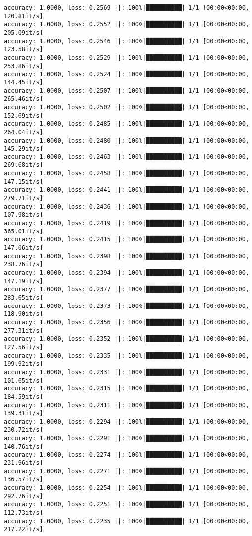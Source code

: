 \documentclass[
]{article}
\begin{document}
\begin{verbatim}
accuracy: 1.0000, loss: 0.2569 ||: 100%|██████████| 1/1 [00:00<00:00, 120.81it/s]
accuracy: 1.0000, loss: 0.2552 ||: 100%|██████████| 1/1 [00:00<00:00, 205.09it/s]
accuracy: 1.0000, loss: 0.2546 ||: 100%|██████████| 1/1 [00:00<00:00, 123.58it/s]
accuracy: 1.0000, loss: 0.2529 ||: 100%|██████████| 1/1 [00:00<00:00, 253.86it/s]
accuracy: 1.0000, loss: 0.2524 ||: 100%|██████████| 1/1 [00:00<00:00, 144.45it/s]
accuracy: 1.0000, loss: 0.2507 ||: 100%|██████████| 1/1 [00:00<00:00, 265.46it/s]
accuracy: 1.0000, loss: 0.2502 ||: 100%|██████████| 1/1 [00:00<00:00, 152.69it/s]
accuracy: 1.0000, loss: 0.2485 ||: 100%|██████████| 1/1 [00:00<00:00, 264.04it/s]
accuracy: 1.0000, loss: 0.2480 ||: 100%|██████████| 1/1 [00:00<00:00, 145.29it/s]
accuracy: 1.0000, loss: 0.2463 ||: 100%|██████████| 1/1 [00:00<00:00, 269.68it/s]
accuracy: 1.0000, loss: 0.2458 ||: 100%|██████████| 1/1 [00:00<00:00, 147.15it/s]
accuracy: 1.0000, loss: 0.2441 ||: 100%|██████████| 1/1 [00:00<00:00, 279.71it/s]
accuracy: 1.0000, loss: 0.2436 ||: 100%|██████████| 1/1 [00:00<00:00, 107.98it/s]
accuracy: 1.0000, loss: 0.2419 ||: 100%|██████████| 1/1 [00:00<00:00, 365.01it/s]
accuracy: 1.0000, loss: 0.2415 ||: 100%|██████████| 1/1 [00:00<00:00, 147.06it/s]
accuracy: 1.0000, loss: 0.2398 ||: 100%|██████████| 1/1 [00:00<00:00, 238.76it/s]
accuracy: 1.0000, loss: 0.2394 ||: 100%|██████████| 1/1 [00:00<00:00, 147.19it/s]
accuracy: 1.0000, loss: 0.2377 ||: 100%|██████████| 1/1 [00:00<00:00, 283.65it/s]
accuracy: 1.0000, loss: 0.2373 ||: 100%|██████████| 1/1 [00:00<00:00, 118.90it/s]
accuracy: 1.0000, loss: 0.2356 ||: 100%|██████████| 1/1 [00:00<00:00, 277.31it/s]
accuracy: 1.0000, loss: 0.2352 ||: 100%|██████████| 1/1 [00:00<00:00, 127.56it/s]
accuracy: 1.0000, loss: 0.2335 ||: 100%|██████████| 1/1 [00:00<00:00, 199.92it/s]
accuracy: 1.0000, loss: 0.2331 ||: 100%|██████████| 1/1 [00:00<00:00, 101.65it/s]
accuracy: 1.0000, loss: 0.2315 ||: 100%|██████████| 1/1 [00:00<00:00, 184.59it/s]
accuracy: 1.0000, loss: 0.2311 ||: 100%|██████████| 1/1 [00:00<00:00, 139.31it/s]
accuracy: 1.0000, loss: 0.2294 ||: 100%|██████████| 1/1 [00:00<00:00, 230.72it/s]
accuracy: 1.0000, loss: 0.2291 ||: 100%|██████████| 1/1 [00:00<00:00, 140.76it/s]
accuracy: 1.0000, loss: 0.2274 ||: 100%|██████████| 1/1 [00:00<00:00, 231.96it/s]
accuracy: 1.0000, loss: 0.2271 ||: 100%|██████████| 1/1 [00:00<00:00, 136.57it/s]
accuracy: 1.0000, loss: 0.2254 ||: 100%|██████████| 1/1 [00:00<00:00, 292.76it/s]
accuracy: 1.0000, loss: 0.2251 ||: 100%|██████████| 1/1 [00:00<00:00, 112.73it/s]
accuracy: 1.0000, loss: 0.2235 ||: 100%|██████████| 1/1 [00:00<00:00, 217.22it/s]

\end{verbatim}
\end{document}
